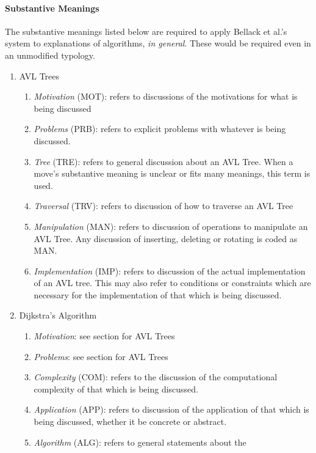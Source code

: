 \documentclass[conference]{IEEEtran}
\begin{document}
\paragraph{Substantive Meanings}
The substantive meanings listed below are required to apply Bellack et al.'s
system to explanations of algorithms, \emph{in general}. These would be required
even in an unmodified typology.
\begin{enumerate}
  \item{AVL Trees}
    \begin{enumerate}
      \item \emph{Motivation} (MOT): refers to discussions of the motivations
        for what is being discussed
      \item \emph{Problems} (PRB): refers to explicit problems with whatever is
        being discussed.
      \item \emph{Tree} (TRE): refers to general discussion about an AVL
        Tree. When a move's substantive meaning is unclear or fits many
        meanings, this term is used.
      \item \emph{Traversal} (TRV): refers to discussion of how to traverse
        an AVL Tree
      \item \emph{Manipulation} (MAN): refers to discussion of operations to
        manipulate an AVL Tree. Any discussion of inserting, deleting or
        rotating is coded as MAN.
      \item \emph{Implementation} (IMP): refers to discussion of the actual
        implementation of an AVL tree. This may also refer to conditions or
        constraints which are necessary for the implementation of that which
        is being discussed.
    \end{enumerate}
  \item{Dijkstra's Algorithm}
    \begin{enumerate}
      \item \emph{Motivation}: see section for AVL Trees
      \item \emph{Problems}: see section for AVL Trees
      \item \emph{Complexity} (COM): refers to the discussion of the computational
        complexity of that which is being discussed. 
      \item \emph{Application} (APP): refers to discussion of the application of
        that which is being discussed, whether it be concrete or abstract.
      \item \emph{Algorithm} (ALG): refers to general statements about the

\end{enumerate}
\end{enumerate}
\end{document}
